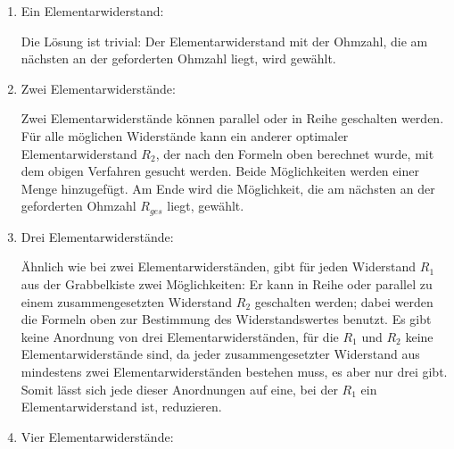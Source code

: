 \documentclass[a4paper,10pt,ngerman]{scrartcl}
\begin{document}
\begin{enumerate}
  \item Ein Elementarwiderstand: 
  
  Die Lösung ist trivial: Der Elementarwiderstand mit der Ohmzahl, die am nächsten an der geforderten Ohmzahl liegt, wird gewählt.
  \item Zwei Elementarwiderstände: 
  
  Zwei Elementarwiderstände können parallel oder in Reihe geschalten werden. Für alle möglichen Widerstände kann ein anderer optimaler Elementarwiderstand $R_2$, der nach den Formeln oben berechnet wurde, mit dem obigen Verfahren gesucht werden. Beide Möglichkeiten werden einer Menge hinzugefügt. Am Ende wird die Möglichkeit, die am nächsten an der geforderten Ohmzahl $R_{ges}$ liegt, gewählt.

  \item Drei Elementarwiderstände: 
  
  Ähnlich wie bei zwei Elementarwiderständen, gibt für jeden Widerstand $R_1$ aus der Grabbelkiste zwei Möglichkeiten: Er kann in Reihe oder parallel zu einem zusammengesetzten Widerstand $R_2$ geschalten werden; dabei werden die Formeln oben zur Bestimmung des Widerstandswertes benutzt. Es gibt keine Anordnung von drei Elementarwiderständen, für die $R_1$ und $R_2$ keine Elementarwiderstände sind, da jeder zusammengesetzter Widerstand aus mindestens zwei Elementarwiderständen bestehen muss, es aber nur drei gibt. Somit lässt sich jede dieser Anordnungen auf eine, bei der $R_1$ ein Elementarwiderstand ist, reduzieren.

  \item Vier Elementarwiderstände: 
  

\end{enumerate}
\end{document}
